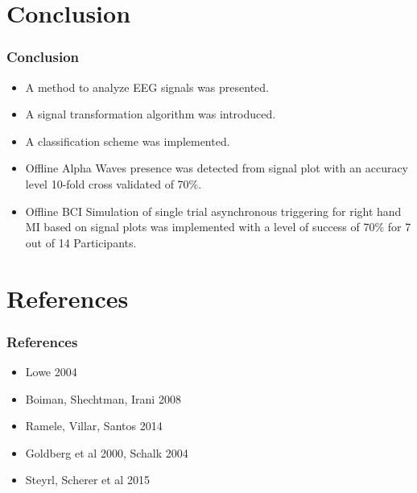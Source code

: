 \documentclass[11pt]{beamer}
\begin{document}
    \section{Conclusion}
    \begin{frame}
        \frametitle{Conclusion}
        \begin{center}
            \begin{itemize}
                \item A method to analyze EEG signals was presented.
                \item A signal transformation algorithm was introduced.
                \item A classification scheme was implemented.
                \item Offline Alpha Waves presence was detected from signal plot with an accuracy level 10-fold cross validated of 70\%.
                \item Offline BCI Simulation of single trial asynchronous triggering for right hand MI based on signal plots was implemented with a level of success of 70\% for 7 out of 14 Participants. 
            \end{itemize}
        \end{center}
    \end{frame}    
    
    
    \section{References}
    \begin{frame} %
        \frametitle{References}
        \begin{itemize}
            \item Lowe 2004
			 \item Boiman, Shechtman, Irani 2008
			 \item Ramele, Villar, Santos 2014
			 \item Goldberg et al 2000, Schalk 2004
			 \item Steyrl, Scherer et al 2015
        \end{itemize}
    \end{frame}

    
\end{document}
